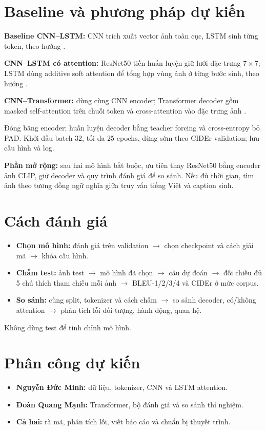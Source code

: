 \documentclass[11pt]{article}
\begin{document}
\section{Baseline và phương pháp dự kiến}
\textbf{Baseline CNN--LSTM:} CNN trích xuất vector ảnh toàn cục, LSTM sinh từng token, theo hướng \citet{vinyals2015show}.

\textbf{CNN--LSTM có attention:} ResNet50 tiền huấn luyện giữ lưới đặc trưng $7\times7$; LSTM dùng additive soft attention để tổng hợp vùng ảnh ở từng bước sinh, theo hướng \citet{xu2015attention}.

\textbf{CNN--Transformer:} dùng cùng CNN encoder; Transformer decoder gồm masked self-attention trên chuỗi token và cross-attention vào đặc trưng ảnh \citep{vaswani2017attention}.

Đóng băng encoder; huấn luyện decoder bằng teacher forcing và cross-entropy bỏ PAD. Khởi đầu batch 32, tối đa 25 epochs, dừng sớm theo CIDEr validation; lưu cấu hình và log.

\textbf{Phần mở rộng:} sau hai mô hình bắt buộc, ưu tiên thay ResNet50 bằng encoder ảnh CLIP, giữ decoder và quy trình đánh giá để so sánh. Nếu đủ thời gian, tìm ảnh theo tương đồng ngữ nghĩa giữa truy vấn tiếng Việt và caption sinh.

\section{Cách đánh giá}
\begin{itemize}
\item \textbf{Chọn mô hình:} đánh giá trên validation $\rightarrow$ chọn checkpoint và cách giải mã $\rightarrow$ khóa cấu hình.
\item \textbf{Chấm test:} ảnh test $\rightarrow$ mô hình đã chọn $\rightarrow$ câu dự đoán $\rightarrow$ đối chiếu đủ 5 chú thích tham chiếu mỗi ảnh $\rightarrow$ BLEU-1/2/3/4 và CIDEr ở mức corpus.
\item \textbf{So sánh:} cùng split, tokenizer và cách chấm $\rightarrow$ so sánh decoder, có/không attention $\rightarrow$ phân tích lỗi đối tượng, hành động, quan hệ.
\end{itemize}
Không dùng test để tinh chỉnh mô hình.

\section{Phân công dự kiến}
\begin{itemize}
\item \textbf{Nguyễn Đức Minh:} dữ liệu, tokenizer, CNN và LSTM attention.
\item \textbf{Đoàn Quang Mạnh:} Transformer, bộ đánh giá và so sánh thí nghiệm.
\item \textbf{Cả hai:} rà mã, phân tích lỗi, viết báo cáo và chuẩn bị thuyết trình.
\end{itemize}

\newpage

\end{document}
